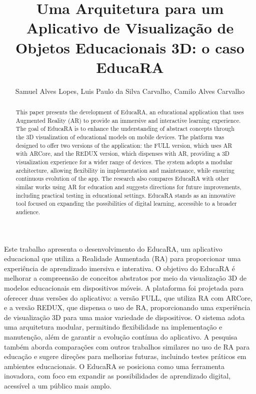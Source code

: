 \documentclass[12pt]{article}
\title{Uma Arquitetura para um Aplicativo de Visualização de Objetos Educacionais 3D: o caso EducaRA}
\author{Samuel Alves Lopes, Luis Paulo da Silva Carvalho, Camilo Alves Carvalho}%
\begin{document}
 

\maketitle

\begin{abstract}
This paper presents the development of EducaRA, an educational application that uses Augmented Reality (AR) to provide an immersive and interactive learning experience. The goal of EducaRA is to enhance the understanding of abstract concepts through the 3D visualization of educational models on mobile devices. The platform was designed to offer two versions of the application: the FULL version, which uses AR with ARCore, and the REDUX version, which dispenses with AR, providing a 3D visualization experience for a wider range of devices. The system adopts a modular architecture, allowing flexibility in implementation and maintenance, while ensuring continuous evolution of the app. The research also compares EducaRA with other similar works using AR for education and suggests directions for future improvements, including practical testing in educational settings. EducaRA stands as an innovative tool focused on expanding the possibilities of digital learning, accessible to a broader audience.
\end{abstract}
     
\begin{resumo} 
Este trabalho apresenta o desenvolvimento do EducaRA, um aplicativo educacional que utiliza a Realidade Aumentada (RA) para proporcionar uma experiência de aprendizado imersiva e interativa. O objetivo do EducaRA é melhorar a compreensão de conceitos abstratos por meio da visualização 3D de modelos educacionais em dispositivos móveis. A plataforma foi projetada para oferecer duas versões do aplicativo: a versão FULL, que utiliza RA com ARCore, e a versão REDUX, que dispensa o uso de RA, proporcionando uma experiência de visualização 3D para uma maior variedade de dispositivos. O sistema adota uma arquitetura modular, permitindo flexibilidade na implementação e manutenção, além de garantir a evolução contínua do aplicativo. A pesquisa também aborda comparações com outros trabalhos similares no uso de RA para educação e sugere direções para melhorias futuras, incluindo testes práticos em ambientes educacionais. O EducaRA se posiciona como uma ferramenta inovadora, com foco em expandir as possibilidades de aprendizado digital, acessível a um público mais amplo.
\end{resumo}
\end{document}
